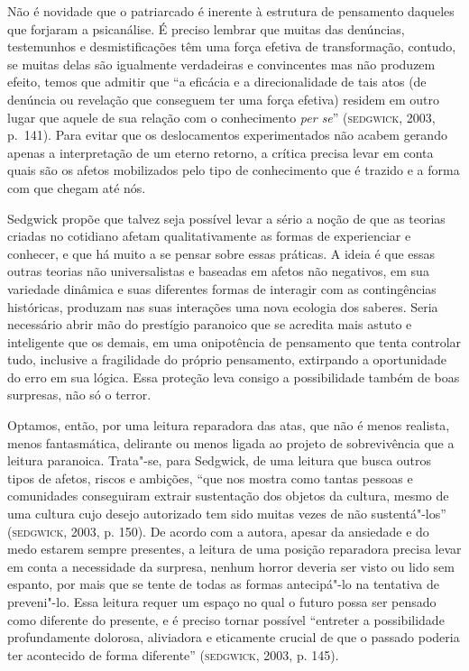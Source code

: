 Não é novidade que o patriarcado é inerente à estrutura de pensamento
daqueles que forjaram a psicanálise. É preciso lembrar que muitas das
denúncias, testemunhos e desmistificações têm uma força efetiva de
transformação, contudo, se muitas delas são igualmente verdadeiras e
convincentes mas não produzem efeito, temos que admitir que ``a eficácia
e a direcionalidade de tais atos (de denúncia ou revelação que conseguem
ter uma força efetiva) residem em outro lugar que aquele de sua relação
com o conhecimento \emph{per se}'' (\textsc{sedgwick}, 2003, p.~141). Para evitar que os
deslocamentos experimentados não acabem gerando apenas a interpretação
de um eterno retorno, a crítica precisa levar em conta quais são os
afetos mobilizados pelo tipo de conhecimento que é trazido e a forma com
que chegam até nós.

Sedgwick propõe que talvez seja possível levar a sério a noção de que as
teorias criadas no cotidiano afetam qualitativamente as formas de
experienciar e conhecer, e que há muito a se pensar sobre essas
práticas. A ideia é que essas outras teorias não universalistas e
baseadas em afetos não negativos, em sua variedade dinâmica e suas
diferentes formas de interagir com as contingências históricas, produzam
nas suas interações uma nova ecologia dos saberes. Seria necessário
abrir mão do prestígio paranoico que se acredita mais astuto e
inteligente que os demais, em uma onipotência de pensamento que tenta
controlar tudo, inclusive a fragilidade do próprio pensamento,
extirpando a oportunidade do erro em sua lógica. Essa proteção leva
consigo a possibilidade também de boas surpresas, não só o terror.

Optamos, então, por uma leitura reparadora das atas, que não é menos
realista, menos fantasmática, delirante ou menos ligada ao projeto de
sobrevivência que a leitura paranoica. Trata"-se, para Sedgwick, de uma
leitura que busca outros tipos de afetos, riscos e ambições, ``que nos
mostra como tantas pessoas e comunidades conseguiram extrair sustentação
dos objetos da cultura, mesmo de uma cultura cujo desejo autorizado tem
sido muitas vezes de não sustentá"-los'' (\textsc{sedgwick}, 2003, p. 150). De
acordo com a autora, apesar da ansiedade e do medo estarem sempre
presentes, a leitura de uma posição reparadora precisa levar em conta a
necessidade da surpresa, nenhum horror deveria ser visto ou lido sem
espanto, por mais que se tente de todas as formas antecipá"-lo na
tentativa de preveni"-lo. Essa leitura requer um espaço no qual o futuro
possa ser pensado como diferente do presente, e é preciso tornar
possível ``entreter a possibilidade profundamente dolorosa, aliviadora e
eticamente crucial de que o passado poderia ter acontecido de forma
diferente'' (\textsc{sedgwick}, 2003, p. 145).

